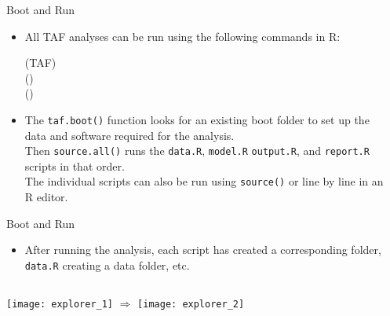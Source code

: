 \documentclass[aspectratio=169]{beamer}
\begin{document}
\begin{frame}{Boot and Run}\small
  \begin{itemize}
    \item[] All TAF analyses can be run using the following commands in
    R:\\[2ex]
    \begin{tt}
      (TAF)\\
      ()\\
      ()\\[3ex]
    \end{tt}
    \item[] The {\tt\blue taf.boot()} function looks for an existing boot folder
    to set up the\\ data and software required for the analysis.\\[3ex]
    Then {\tt\blue source.all()} runs the {\tt data.R}, {\tt model.R}
    {\tt output.R}, and {\tt report.R}\\ scripts in that order.\\[3ex]
    The individual scripts can also be run using {\tt\blue source()} or line by
    line in an\\
    R editor.\\[4ex]
  \end{itemize}
\end{frame}


\begin{frame}{Boot and Run}\small
  \begin{itemize}
    \item[] After running the analysis, each script has created a corresponding
    folder,\\[0.2ex]
    {\tt data.R} creating a data folder, etc.\\[4ex]
  \end{itemize}
  \centering
  \begin{columns}[T]
    \texttt{[image: explorer\_1]}
    \vspace{4ex}
    \centering\green\large$\Rightarrow$
    \texttt{[image: explorer\_2]}
  \end{columns}
\end{frame}
\end{document}
